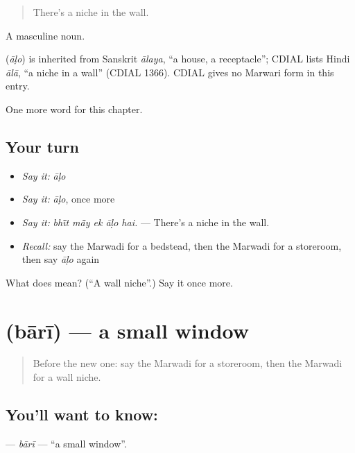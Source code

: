 \begin{quote}
There's a niche in the wall.
\end{quote}

A masculine noun.

\begin{cousinweb}
\textbf{} (\emph{āḷo}) is inherited from Sanskrit \emph{ālaya}, \textquotedblleft{}a house, a receptacle\textquotedblright{}; CDIAL lists Hindi \emph{ālā}, \textquotedblleft{}a niche in a wall\textquotedblright{} (CDIAL 1366). CDIAL gives no Marwari form in this entry.
\end{cousinweb}

\begin{grammarlens}[title={What you've built}]
One more word for this chapter.
\end{grammarlens}

\subsection*{Your turn}
\begin{itemize}
\raggedright
  \item \emph{Say it:} \emph{āḷo}
  \item \emph{Say it:} \emph{āḷo}, once more
  \item \emph{Say it:} \emph{bhī̃t mā̃y ek āḷo hai.} — There's a niche in the wall.
  \item \emph{Recall:} say the Marwadi for a bedstead, then the Marwadi for a storeroom, then say \emph{āḷo} again
\end{itemize}

\begin{tcolorbox}[breakable,colback=teal!4,colframe=teal!35!black,title={Before you move on}]
What does  mean? (\textquotedblleft{}A wall niche\textquotedblright{}.) Say it once more.
\end{tcolorbox}
\section[\texorpdfstring{\mw{बारी} (bārī)}{बारी (bārī)}]{ (bārī) — a small window}

\label{lesson:MW-C187-bari}



\begin{quote}
Before the new one: say the Marwadi for a storeroom, then the Marwadi for a wall niche.
\end{quote}

\subsection*{You'll want to know: }
\textbf{} — \emph{bārī} — \textquotedblleft{}a small window\textquotedblright{}.

